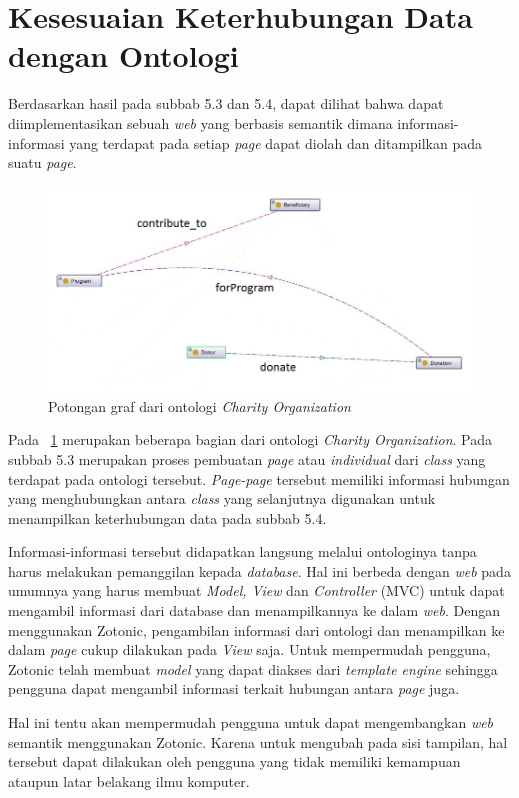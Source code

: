 \section{Kesesuaian Keterhubungan Data dengan Ontologi}

Berdasarkan hasil pada subbab 5.3 dan 5.4, dapat dilihat bahwa dapat diimplementasikan sebuah \textit{web} yang berbasis semantik dimana informasi-informasi yang terdapat pada setiap \textit{page} dapat diolah dan ditampilkan pada suatu \textit{page}.

\begin{figure}
	\centering
	\includegraphics[width=1\textwidth]
	{pics/ontologi.jpg}
	\caption{Potongan graf dari ontologi \textit{Charity Organization}}
	\label{fig:ontologi}
\end{figure}
\vspace{-0.3cm}

Pada \pic~\ref{fig:ontologi} merupakan beberapa bagian dari ontologi \textit{Charity Organization}. Pada subbab 5.3 merupakan proses pembuatan \textit{page} atau \textit{individual} dari \textit{class} yang terdapat pada ontologi tersebut. \textit{Page-page} tersebut memiliki informasi hubungan yang menghubungkan antara \textit{class} yang selanjutnya digunakan untuk menampilkan keterhubungan data pada subbab 5.4.

Informasi-informasi tersebut didapatkan langsung melalui ontologinya tanpa harus melakukan pemanggilan kepada \textit{database}. Hal ini berbeda dengan \textit{web} pada umumnya yang harus membuat \textit{Model, View} dan \textit{Controller} (MVC) untuk dapat mengambil informasi dari database dan menampilkannya ke dalam \textit{web}. Dengan menggunakan Zotonic, pengambilan informasi dari ontologi dan menampilkan ke dalam \textit{page} cukup dilakukan pada \textit{View} saja. Untuk mempermudah pengguna, Zotonic telah membuat \textit{model} yang dapat diakses dari \textit{template engine} sehingga pengguna dapat mengambil informasi terkait hubungan antara \textit{page} juga.

Hal ini tentu akan mempermudah pengguna untuk dapat mengembangkan \textit{web} semantik menggunakan Zotonic. Karena untuk mengubah pada sisi tampilan, hal tersebut dapat dilakukan oleh pengguna yang tidak memiliki kemampuan ataupun latar belakang ilmu komputer.
